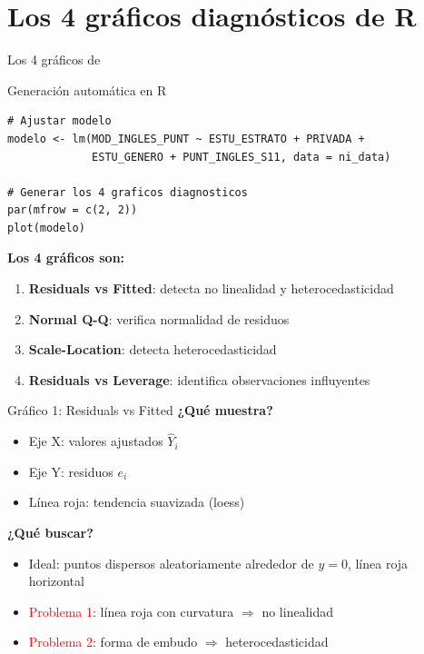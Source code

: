 \documentclass[aspectratio=169, 11pt]{beamer}
\begin{document}
\section{Los 4 gráficos diagnósticos de R}

\begin{frame}[fragile]{Los 4 gráficos de }
\begin{block}{Generación automática en R}
\begin{lstlisting}
# Ajustar modelo
modelo <- lm(MOD_INGLES_PUNT ~ ESTU_ESTRATO + PRIVADA +
             ESTU_GENERO + PUNT_INGLES_S11, data = ni_data)

# Generar los 4 graficos diagnosticos
par(mfrow = c(2, 2))
plot(modelo)
\end{lstlisting}
\end{block}

\textbf{Los 4 gráficos son:}
\begin{enumerate}
\item \textbf{Residuals vs Fitted}: detecta no linealidad y heterocedasticidad
\item \textbf{Normal Q-Q}: verifica normalidad de residuos
\item \textbf{Scale-Location}: detecta heterocedasticidad
\item \textbf{Residuals vs Leverage}: identifica observaciones influyentes
\end{enumerate}
\end{frame}

\begin{frame}{Gráfico 1: Residuals vs Fitted}
\textbf{¿Qué muestra?}
\begin{itemize}
\item Eje X: valores ajustados $\hat{Y}_i$
\item Eje Y: residuos $e_i$
\item Línea roja: tendencia suavizada (loess)
\end{itemize}

\vspace{0.3cm}
\textbf{¿Qué buscar?}
\begin{itemize}
\item \textcolor{javerianalight}{Ideal}: puntos dispersos aleatoriamente alrededor de $y=0$, línea roja horizontal
\item \textcolor{red}{Problema 1}: línea roja con curvatura $\Rightarrow$ no linealidad
\item \textcolor{red}{Problema 2}: forma de embudo $\Rightarrow$ heterocedasticidad
\end{itemize}
\end{frame}
\end{document}
